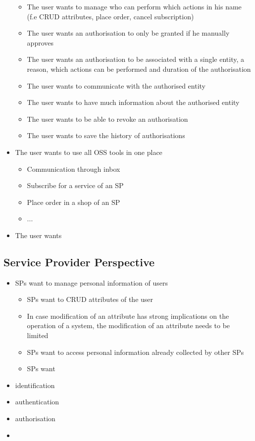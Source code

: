 \documentclass[
     12pt,         %
     a4paper,      %
     BCOR=10mm,version=first,     %
     DIV=14,version=first,        %
     ]{scrreprt}
\begin{document}
\begin{itemize}
\begin{itemize}
        \item The user wants to manage who can perform which actions in his name (f.e CRUD attributes, place order, cancel subscription)
        \item The user wants an authorisation to only be granted if he manually approves
        \item The user wants an authorisation to be associated with a single entity, a reason, which actions can be performed and duration of the authorisation
        \item The user wants to communicate with the authorised entity
        \item The user wants to have much information about the authorised entity
        \item The user wants to be able to revoke an authorisation
        \item The user wants to save the history of authorisations
    \end{itemize}
    \item The user wants to use all OSS tools in one place
    \begin{itemize}
        \item Communication through inbox
        \item Subscribe for a service of an SP
        \item Place order in a shop of an SP
        \item ...
    \end{itemize}
    \item The user wants

\end{itemize}

\subsection{Service Provider Perspective}

\begin{itemize}
    \item SPs want to manage personal information of users
    \begin{itemize}
        \item SPs want to CRUD attributes of the user
        \item In case modification of an attribute has strong implications on the operation of a system, the modification of an attribute needs to be limited
        \item SPs want to access personal information already collected by other SPs
        \item SPs want 
    \end{itemize}
    \item identification
    \item authentication
    \item authorisation
    \item 
\end{itemize}
\end{document}
